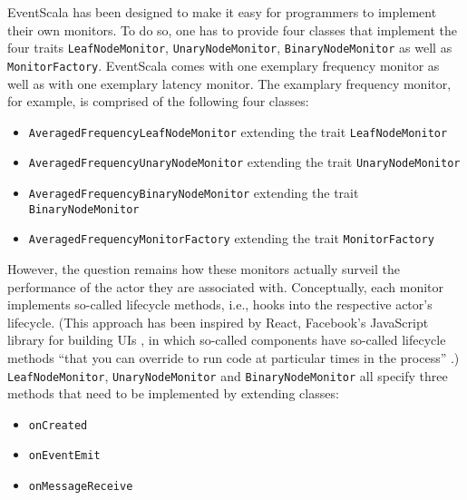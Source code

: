 \documentclass[article, type=bsc, colorback, accentcolor=tud8b, parskip=half, bibliography=totocnumbered]{tudthesis}
\begin{document}
EventScala has been designed to make it easy for programmers to implement their own monitors.
To do so, one has to provide four classes that implement the four traits \lstinline{LeafNodeMonitor}, \lstinline{UnaryNodeMonitor}, \lstinline{BinaryNodeMonitor} as well as \lstinline{MonitorFactory}.
EventScala comes with one exemplary frequency monitor as well as with one exemplary latency monitor. The examplary frequency monitor, for example, is comprised of the following four classes:

\begin{itemize}

\item
\lstinline{AveragedFrequencyLeafNodeMonitor} extending the trait \lstinline{LeafNodeMonitor}

\item
\lstinline{AveragedFrequencyUnaryNodeMonitor} extending the trait \lstinline{UnaryNodeMonitor}

\item
\lstinline{AveragedFrequencyBinaryNodeMonitor} extending the trait \lstinline{BinaryNodeMonitor}

\item
\lstinline{AveragedFrequencyMonitorFactory} extending the trait \lstinline{MonitorFactory}

\end{itemize}

However, the question remains how these monitors actually surveil the performance of the actor they are associated with.
Conceptually, each monitor implements so-called lifecycle methods, i.e., hooks into the respective actor's lifecycle.
(This approach has been inspired by React, Facebook's JavaScript library for building UIs \cite{react}, in which so-called components have so-called lifecycle methods ``that you can override to run code at particular times in the process'' \cite{reactcomponent}.)
\lstinline{LeafNodeMonitor}, \lstinline{UnaryNodeMonitor} and \lstinline{BinaryNodeMonitor} all specify three methods that need to be implemented by extending classes:

\begin{itemize}

\item
\lstinline{onCreated}

\item
\lstinline{onEventEmit}

\item
\lstinline{onMessageReceive}

\end{itemize}
\end{document}
